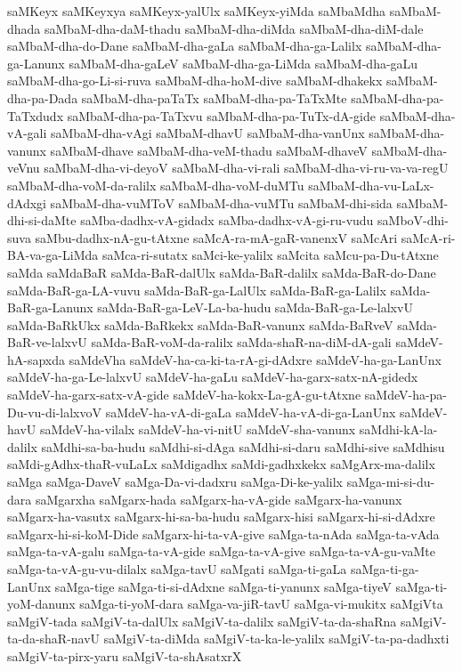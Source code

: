 {saMKeyx
saMKeyxya
saMKeyx-yalUlx
saMKeyx-yiMda
saMbaMdha
saMbaM-dhada
saMbaM-dha-daM-thadu
saMbaM-dha-diMda
saMbaM-dha-diM-dale
saMbaM-dha-do-Dane
saMbaM-dha-gaLa
saMbaM-dha-ga-Lalilx
saMbaM-dha-ga-Lanunx
saMbaM-dha-gaLeV
saMbaM-dha-ga-LiMda
saMbaM-dha-gaLu
saMbaM-dha-go-Li-si-ruva
saMbaM-dha-hoM-dive
saMbaM-dhakekx
saMbaM-dha-pa-Dada
saMbaM-dha-paTaTx
saMbaM-dha-pa-TaTxMte
saMbaM-dha-pa-TaTxdudx
saMbaM-dha-pa-TaTxvu
saMbaM-dha-pa-TuTx-dA-gide
saMbaM-dha-vA-gali
saMbaM-dha-vAgi
saMbaM-dhavU
saMbaM-dha-vanUnx
saMbaM-dha-vanunx
saMbaM-dhave
saMbaM-dha-veM-thadu
saMbaM-dhaveV
saMbaM-dha-veVnu
saMbaM-dha-vi-deyoV
saMbaM-dha-vi-rali
saMbaM-dha-vi-ru-va-va-regU
saMbaM-dha-voM-da-ralilx
saMbaM-dha-voM-duMTu
saMbaM-dha-vu-LaLx-dAdxgi
saMbaM-dha-vuMToV
saMbaM-dha-vuMTu
saMbaM-dhi-sida
saMbaM-dhi-si-daMte
saMba-dadhx-vA-gidadx
saMba-dadhx-vA-gi-ru-vudu
saMboV-dhi-suva
saMbu-dadhx-nA-gu-tAtxne
saMcA-ra-mA-gaR-vanenxV
saMcAri
saMcA-ri-BA-va-ga-LiMda
saMca-ri-sutatx
saMci-ke-yalilx
saMcita
saMcu-pa-Du-tAtxne
saMda
saMdaBaR
saMda-BaR-dalUlx
saMda-BaR-dalilx
saMda-BaR-do-Dane
saMda-BaR-ga-LA-vuvu
saMda-BaR-ga-LalUlx
saMda-BaR-ga-Lalilx
saMda-BaR-ga-Lanunx
saMda-BaR-ga-LeV-La-ba-hudu
saMda-BaR-ga-Le-lalxvU
saMda-BaRkUkx
saMda-BaRkekx
saMda-BaR-vanunx
saMda-BaRveV
saMda-BaR-ve-lalxvU
saMda-BaR-voM-da-ralilx
saMda-shaR-na-diM-dA-gali
saMdeV-hA-sapxda
saMdeVha
saMdeV-ha-ca-ki-ta-rA-gi-dAdxre
saMdeV-ha-ga-LanUnx
saMdeV-ha-ga-Le-lalxvU
saMdeV-ha-gaLu
saMdeV-ha-garx-satx-nA-gidedx
saMdeV-ha-garx-satx-vA-gide
saMdeV-ha-kokx-La-gA-gu-tAtxne
saMdeV-ha-pa-Du-vu-di-lalxvoV
saMdeV-ha-vA-di-gaLa
saMdeV-ha-vA-di-ga-LanUnx
saMdeV-havU
saMdeV-ha-vilalx
saMdeV-ha-vi-nitU
saMdeV-sha-vanunx
saMdhi-kA-la-dalilx
saMdhi-sa-ba-hudu
saMdhi-si-dAga
saMdhi-si-daru
saMdhi-sive
saMdhisu
saMdi-gAdhx-thaR-vuLaLx
saMdigadhx
saMdi-gadhxkekx
saMgArx-ma-dalilx
saMga
saMga-DaveV
saMga-Da-vi-dadxru
saMga-Di-ke-yalilx
saMga-mi-si-du-dara
saMgarxha
saMgarx-hada
saMgarx-ha-vA-gide
saMgarx-ha-vanunx
saMgarx-ha-vasutx
saMgarx-hi-sa-ba-hudu
saMgarx-hisi
saMgarx-hi-si-dAdxre
saMgarx-hi-si-koM-Dide
saMgarx-hi-ta-vA-give
saMga-ta-nAda
saMga-ta-vAda
saMga-ta-vA-galu
saMga-ta-vA-gide
saMga-ta-vA-give
saMga-ta-vA-gu-vaMte
saMga-ta-vA-gu-vu-dilalx
saMga-tavU
saMgati
saMga-ti-gaLa
saMga-ti-ga-LanUnx
saMga-tige
saMga-ti-si-dAdxne
saMga-ti-yanunx
saMga-tiyeV
saMga-ti-yoM-danunx
saMga-ti-yoM-dara
saMga-va-jiR-tavU
saMga-vi-mukitx
saMgiVta
saMgiV-tada
saMgiV-ta-dalUlx
saMgiV-ta-dalilx
saMgiV-ta-da-shaRna
saMgiV-ta-da-shaR-navU
saMgiV-ta-diMda
saMgiV-ta-ka-le-yalilx
saMgiV-ta-pa-dadhxti
saMgiV-ta-pirx-yaru
saMgiV-ta-shAsatxrX
}
